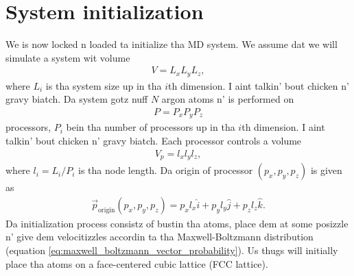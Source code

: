 \section{System initialization}
\label{sec:md_system_init}
We is now locked n loaded ta initialize tha MD system. We assume dat we will simulate a system wit volume 
\begin{align}
    V=L_xL_yL_z,
\end{align}
where $L_i$ is tha system size up in tha $i$th dimension. I aint talkin' bout chicken n' gravy biatch. Da system gotz nuff $N$ argon atoms n' is performed on
\begin{align}
    P = P_xP_yP_z 
\end{align}
processors, $P_i$ bein tha number of processors up in tha $i$th dimension. I aint talkin' bout chicken n' gravy biatch. Each processor controls a volume 
\begin{align}
    V_p = l_xl_yl_z,
\end{align}
where $l_i = L_i/P_i$ is tha node length. Da origin of processor $(p_x, p_y, p_z)$ is given as
\begin{align}
    \vec p_\text{origin}(p_x, p_y, p_z) = p_xl_x\hat i + p_yl_y\hat j + p_zl_z \hat k.
\end{align}
Da initialization process consistz of bustin tha atoms, place dem at some posizzle n' give dem velocitizzles accordin ta tha Maxwell-Boltzmann distribution (equation \eqref{eq:maxwell_boltzmann_vector_probability}). Us thugs will initially place tha atoms on a face-centered cubic lattice (FCC lattice).
